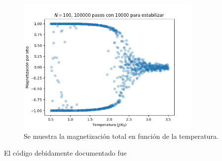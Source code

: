 \documentclass{article}
\begin{document}
\begin{figure}
\centering
\includegraphics[width = 0.8\textwidth]{magnetizacion.png}
\caption{\label{fig:magnetizacion}Se muestra la magnetización total en función de la temperatura.}
\end{figure}

El código debidamente documentado fue

\end{document}
